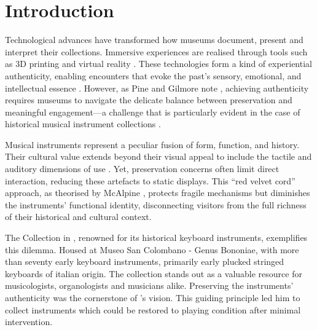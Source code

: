 \section{Introduction}\label{introduction}

Technological advances have transformed how museums document, present and interpret their collections. Immersive experiences are realised through tools such as 3D printing and virtual reality \cite{allard2005use,Wachowiak01082009,RCM_2024_3D,Kuzminsky_LaserScan_2012,Schaich_3D_2007}. These technologies form a kind of experiential authenticity, enabling encounters that evoke the past's sensory, emotional, and intellectual essence \cite{trant_Auth_1999}. However, as Pine and Gilmore note \cite{pinegilmore_2007}, achieving authenticity requires museums to navigate the delicate balance between preservation and meaningful engagement—a challenge that is particularly evident in the case of historical musical instrument collections \cite{McAlpine2014}.

Musical instruments represent a peculiar fusion of form, function, and history. Their cultural value extends beyond their visual appeal to include the tactile and auditory dimensions of use \cite{Fritz2017}. Yet, preservation concerns often limit direct interaction, reducing these artefacts to static displays. This ``red velvet cord'' approach, as theorised by McAlpine \cite{McAlpine2014}, protects fragile mechanisms but diminishes the instruments’ functional identity, disconnecting visitors from the full richness of their historical and cultural context.

The  Collection in , renowned for its historical keyboard instruments, exemplifies this dilemma. Housed at Museo San Colombano - Genus Bononiae, with more than seventy early keyboard instruments, primarily early plucked stringed keyboards of italian origin. The collection stands out as a valuable resource for musicologists, organologists and musicians alike. Preserving the instruments' authenticity was the cornerstone of ’s vision. This guiding principle led him to collect instruments which could be restored to playing condition after minimal intervention. 

